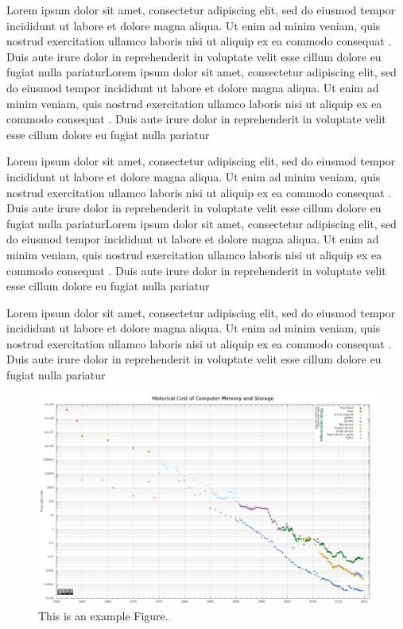 Lorem ipsum dolor sit amet, consectetur adipiscing elit, sed do eiusmod tempor incididunt ut labore et dolore magna aliqua. Ut enim ad minim veniam, quis nostrud exercitation ullamco laboris nisi ut aliquip ex ea commodo consequat \cite{ref1}. Duis aute irure dolor in reprehenderit in voluptate velit esse cillum dolore eu fugiat nulla pariaturLorem ipsum dolor sit amet, consectetur adipiscing elit, sed do eiusmod tempor incididunt ut labore et dolore magna aliqua. Ut enim ad minim veniam, quis nostrud exercitation ullamco laboris nisi ut aliquip ex ea commodo consequat \cite{ref1}. Duis aute irure dolor in reprehenderit in voluptate velit esse cillum dolore eu fugiat nulla pariatur

Lorem ipsum dolor sit amet, consectetur adipiscing elit, sed do eiusmod tempor incididunt ut labore et dolore magna aliqua. Ut enim ad minim veniam, quis nostrud exercitation ullamco laboris nisi ut aliquip ex ea commodo consequat \cite{ref1}. Duis aute irure dolor in reprehenderit in voluptate velit esse cillum dolore eu fugiat nulla pariaturLorem ipsum dolor sit amet, consectetur adipiscing elit, sed do eiusmod tempor incididunt ut labore et dolore magna aliqua. Ut enim ad minim veniam, quis nostrud exercitation ullamco laboris nisi ut aliquip ex ea commodo consequat \cite{ref1}. Duis aute irure dolor in reprehenderit in voluptate velit esse cillum dolore eu fugiat nulla pariatur

Lorem ipsum dolor sit amet, consectetur adipiscing elit, sed do eiusmod tempor incididunt ut labore et dolore magna aliqua. Ut enim ad minim veniam, quis nostrud exercitation ullamco laboris nisi ut aliquip ex ea commodo consequat \cite{ref1}. Duis aute irure dolor in reprehenderit in voluptate velit esse cillum dolore eu fugiat nulla pariatur


\begin{figure}
	\includegraphics[width=\textwidth]{figures/exampleFigure.png}
	\caption{This is an example Figure.}
	\label{Figure in Chapter 1}
\end{figure}


